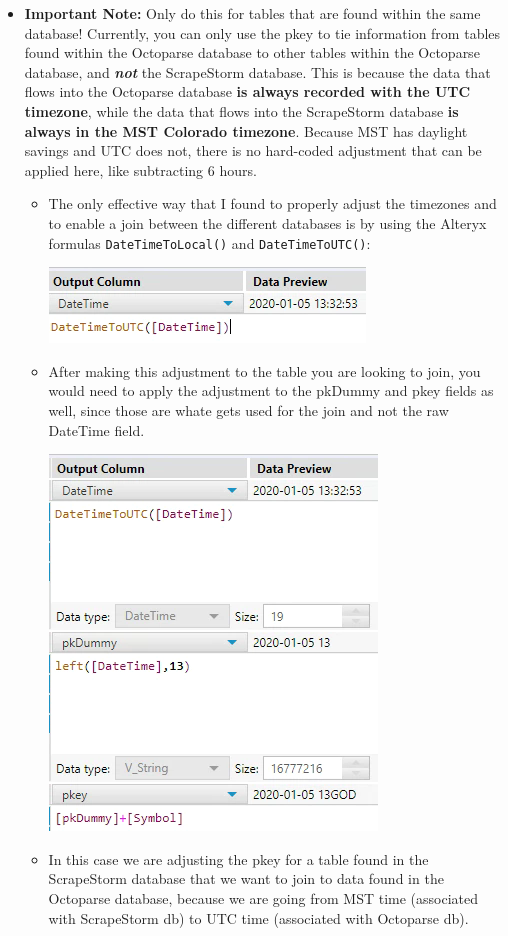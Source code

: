 \documentclass[
]{book}
\begin{document}
\begin{itemize}
\item
  \textbf{Important Note:} Only do this for tables that are found within the same database! Currently, you can only use the pkey to tie information from tables found within the Octoparse database to other tables within the Octoparse database, and \textbf{\emph{not}} the ScrapeStorm database. This is because the data that flows into the Octoparse database \textbf{is always recorded with the UTC timezone}, while the data that flows into the ScrapeStorm database \textbf{is always in the MST Colorado timezone}. Because MST has daylight savings and UTC does not, there is no hard-coded adjustment that can be applied here, like subtracting 6 hours.

  \begin{itemize}
  \item
    The only effective way that I found to properly adjust the timezones and to enable a join between the different databases is by using the Alteryx formulas \texttt{DateTimeToLocal()} and \texttt{DateTimeToUTC()}:

    \includegraphics{images/AlteryxDateTimeFormula.png}
  \item
    After making this adjustment to the table you are looking to join, you would need to apply the adjustment to the pkDummy and pkey fields as well, since those are whate gets used for the join and not the raw DateTime field.

    \includegraphics{images/AlteryxAdjustpkey.png}
  \item
    In this case we are adjusting the pkey for a table found in the ScrapeStorm database that we want to join to data found in the Octoparse database, because we are going from MST time (associated with ScrapeStorm db) to UTC time (associated with Octoparse db).
  \end{itemize}
\end{itemize}
\end{document}
